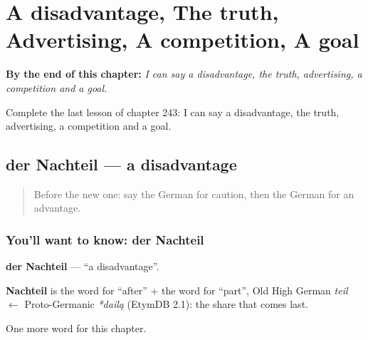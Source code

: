 
\chapter{A disadvantage, The truth, Advertising, A competition, A goal}
\label{ch:ge-a-disadvantage-the-truth-advertising-a-competition-a-goal}

\begin{chapteropening}
\textbf{By the end of this chapter:} \emph{I can say a disadvantage, the truth, advertising, a competition and a goal.}

Complete the last lesson of chapter 243: I can say a disadvantage, the truth, advertising, a competition and a goal.
\end{chapteropening}

\section[der Nachteil]{der Nachteil — a disadvantage}

\label{lesson:GE-C243-nachteil}



\begin{quote}
Before the new one: say the German for caution, then the German for an advantage.
\end{quote}

\subsection*{You'll want to know: der Nachteil}
\textbf{der Nachteil} — \textquotedblleft{}a disadvantage\textquotedblright{}.

\begin{cousinweb}
\textbf{Nachteil} is the word for \textquotedblleft{}after\textquotedblright{} + the word for \textquotedblleft{}part\textquotedblright{}, Old High German \emph{teil} $\leftarrow$ Proto-Germanic \emph{*dailą} (EtymDB 2.1): the share that comes last.
\end{cousinweb}

\begin{grammarlens}[title={What you've built}]
One more word for this chapter.
\end{grammarlens}

